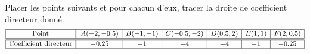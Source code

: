 
\begin{exercice}\label{exosmath-0301}

    Placer les points suivants et pour chacun d'eux, tracer la droite de coefficient directeur donné.
    \begin{equation*}
        \begin{array}[]{|c||c|c|c|c|c|c|}
            \hline
            \text{Point}&A(-2;-0.5)&B(-1;-1)&C(-0.5;-2)&D(0.5;2)&E(1;1)&F(2;0.5)\\
            \hline\hline
            \text{Coefficient directeur}&-0.25&-1&-4&-4&-1&-0.25\\
            \hline
        \end{array}
    \end{equation*}

\end{exercice}

